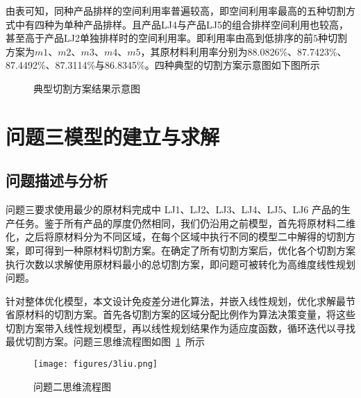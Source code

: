 \documentclass{whutmod}
\begin{document}
		由表可知，同种产品排样的空间利用率普遍较高，即空间利用率最高的五种切割方式中有四种为单种产品排样。且产品LJ4与产品LJ5的组合排样空间利用也较高，甚至高于产品LJ2单独排样时的空间利用率。即利用率由高到低排序的前$5$种切割方案为$m1$、$m2$、$m3$、$m4$、$m5$，其原材料利用率分别为88.0826\%、87.7423\%、87.4492\%、87.3114\%与86.8345\%。四种典型的切割方案示意图如下图所示
		
		\begin{figure}[H]
			\centering
				\caption{典型切割方案结果示意图}
		\end{figure}
%
  
    \section{问题三模型的建立与求解}
    	\subsection{问题描述与分析}
        问题三要求使用最少的原材料完成中 LJ1、LJ2、LJ3、LJ4、LJ5、LJ6 产品的生产任务。鉴于所有产品的厚度仍然相同，我们仍沿用之前模型，首先将原材料二维化，之后将原材料分为不同区域，在每个区域中执行不同的模型二中解得的切割方案，即可得到一种原材料切割方案。在确定了所有切割方案后，优化各个切割方案执行次数以求解使用原材料最小的总切割方案，即问题可被转化为高维度线性规划问题。
        
        针对整体优化模型，本文设计免疫差分进化算法，并嵌入线性规划，优化求解最节省原材料的切割方案。首先各切割方案的区域分配比例作为算法决策变量，将这些切割方案带入线性规划模型，再以线性规划结果作为适应度函数，循环迭代以寻找最优切割方案。问题三思维流程图如图~\ref{asdasf}~所示	
        \begin{figure}[H]
        	\centering
        	\texttt{[image: figures/3liu.png]}
        	\caption{问题二思维流程图}\label{asdasf}
        \end{figure}
    
\end{document}
